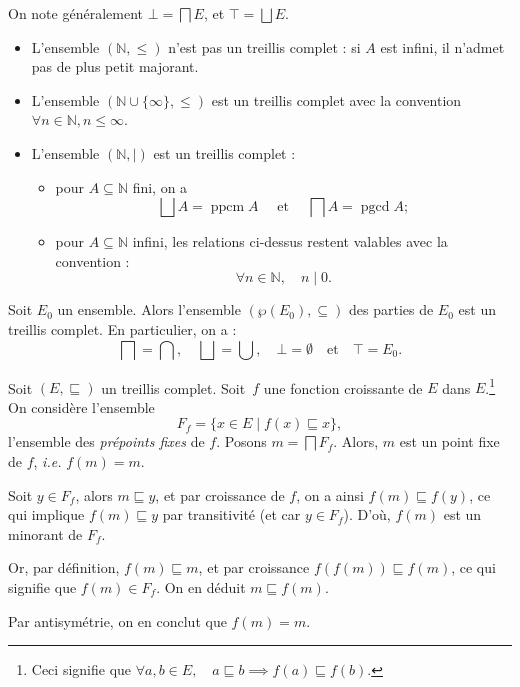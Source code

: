 \documentclass[../main]{subfiles}
\begin{document}
  \begin{nota}
    On note généralement $\bot = \bigsqcap E$, et $\top = \bigsqcup E$.
  \end{nota}

  \begin{exm}
    \begin{itemize}
      \item L'ensemble $(\mathds{N}, \le)$ n'est pas un treillis complet : si $A$ est infini, il n'admet pas de plus petit majorant.
      \item L'ensemble $(\mathds{N} \cup \{\infty\}, \le)$ est un treillis complet avec la convention $\forall n \in \mathds{N}, n \le \infty$.
      \item L'ensemble  $(\mathds{N},  \mid )$ est un treillis complet :
        \begin{itemize}
          \item pour $A \subseteq \mathds{N}$ fini, on a
            \[
             \bigsqcup A = \operatorname{ppcm} A \quad \text{ et  } \quad \bigsqcap A = \operatorname{pgcd} A
            ;\]
          \item pour $A\subseteq \mathds{N}$ infini, les relations ci-dessus restent valables avec la convention :
            \[
            \forall n \in  \mathds{N}, \quad n \mid 0
            .\] 
        \end{itemize}
    \end{itemize}
  \end{exm}

  \begin{exm}
    Soit $E_0$ un ensemble.
    Alors l'ensemble $(\wp(E_0), \subseteq)$ des parties de $E_0$ est un treillis complet.
    En particulier, on a :
    \[
    \bigsqcap = \bigcap, \quad \bigsqcup = \bigcup, \quad \bot = \emptyset \quad \text{et} \quad \top = E_0
    .\] 
  \end{exm}

  \begin{thm} \label{thm:kt}
    Soit $(E, \sqsubseteq)$ un treillis complet.
    Soit~$f$ une fonction croissante de $E$ dans $E$.\footnote{Ceci signifie que $\forall a,b \in E, \quad a \sqsubseteq b \implies f(a) \sqsubseteq f(b)$.}
    On considère l'ensemble \[
    F_f = \{ x \in E  \mid  f(x) \sqsubseteq x \}
    ,\] 
    l'ensemble des \textit{prépoints fixes} de $f$.
    Posons $m = \bigsqcap F_f$. Alors, $m$ est un point fixe de $f$, \textit{i.e.} $f(m) = m$.
  \end{thm}
  \begin{prv}
    Soit $y \in F_f$, alors $m \sqsubseteq y$, et par croissance de $f$, on a ainsi $f(m) \sqsubseteq f(y)$, ce qui implique $f(m) \sqsubseteq y$ par transitivité (et car $y \in F_f$).
    D'où, $f(m)$ est un minorant de $F_f$.

    Or, par définition, $f(m) \sqsubseteq m$, et par croissance $f(f(m)) \sqsubseteq f(m)$, ce qui signifie que $f(m) \in F_f$.
    On en déduit $m \sqsubseteq f(m)$.

    Par antisymétrie, on en conclut que $f(m) = m$.
  \end{prv}
\end{document}
